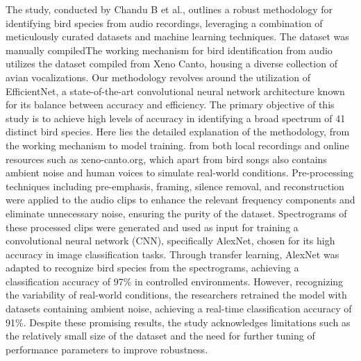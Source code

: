 The study, conducted by Chandu B et al.\cite{chandu2020automated}, outlines a
robust methodology for identifying bird species from audio recordings,
leveraging a combination of meticulously curated datasets and machine learning
techniques. The dataset was manually compiledThe working mechanism for bird
identification from audio utilizes the dataset compiled from Xeno Canto,
housing a diverse collection of avian vocalizations. Our methodology revolves
around the utilization of EfficientNet, a state-of-the-art convolutional neural
network architecture known for its balance between accuracy and efficiency.
The primary objective of this study is to achieve high levels of accuracy in
identifying a broad spectrum of 41 distinct bird species. Here lies the
detailed explanation of the methodology, from the working mechanism to model
training. from both local recordings and online resources such as
xeno-canto.org, which apart from bird songs also contains ambient noise and
human voices to simulate real-world conditions. Pre-processing techniques
including pre-emphasis, framing, silence removal, and reconstruction were
applied to the audio clips to enhance the relevant frequency components and
eliminate unnecessary noise, ensuring the purity of the dataset. Spectrograms
of these processed clips were generated and used as input for training a
convolutional neural network (CNN), specifically AlexNet, chosen for its high
accuracy in image classification tasks. Through transfer learning, AlexNet was
adapted to recognize bird species from the spectrograms, achieving a
classification accuracy of 97\% in controlled environments. However,
recognizing the variability of real-world conditions, the researchers retrained
the model with datasets containing ambient noise, achieving a real-time
classification accuracy of 91\%. Despite these promising results, the study
acknowledges limitations such as the relatively small size of the dataset and
the need for further tuning of performance parameters to improve robustness.\\

